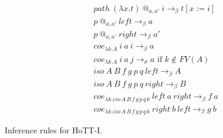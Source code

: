 \documentclass{amsart}
\theoremstyle{definition}
\theoremstyle{remark}
\numberwithin{figure}{section}
\begin{document}
\begin{table}
\begin{align*}
& path\ (\lambda x. t)\ @_{a,a'}\ i \to_\beta t[x := i] \\
& p\ @_{a,a'}\ left \to_\beta a \\
& p\ @_{a,a'}\ right \to_\beta a' \\
& coe_{\lambda k.A}\ i\ a\ i \to_\beta a \\
& coe_{\lambda k.A}\ i\ a\ j \to_\sigma a \text{ if } k \notin FV(A) \\
& iso\ A\ B\ f\ g\ p\ q\ left \to_\beta A \\
& iso\ A\ B\ f\ g\ p\ q\ right \to_\beta B \\
& coe_{\lambda k. iso\,A\,B\,f\,g\,p\,q\,k}\ left\ a\ right \to_\beta f\ a \\
& coe_{\lambda k. iso\,A\,B\,f\,g\,p\,q\,k}\ right\ b\ left \to_\beta g\ b
\end{align*}

\bigskip
\caption{Inference rules for HoTT-I.}
\label{table:HoTT-I-rules}
\end{table}

% 
% 
\end{document}

